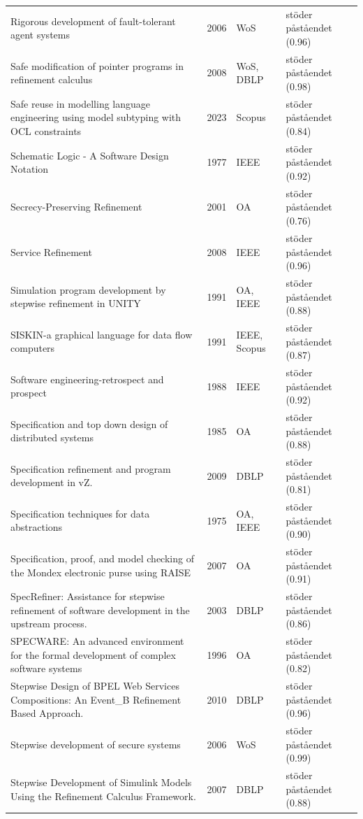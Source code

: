 \begin{longtable}{@{}%
  >{\raggedright\arraybackslash}p{}c%
  >{\raggedright\arraybackslash}p{}%
  >{\raggedright\arraybackslash}p{}@{}}
Rigorous development of fault-tolerant agent systems & 2006 & WoS & stöder påståendet (0.96) \\
Safe modification of pointer programs in refinement calculus & 2008 & WoS, DBLP & stöder påståendet (0.98) \\
Safe reuse in modelling language engineering using model subtyping with OCL constraints & 2023 & Scopus & stöder påståendet (0.84) \\
Schematic Logic - A Software Design Notation & 1977 & IEEE & stöder påståendet (0.92) \\
Secrecy-Preserving Refinement & 2001 & OA & stöder påståendet (0.76) \\
Service Refinement & 2008 & IEEE & stöder påståendet (0.96) \\
Simulation program development by stepwise refinement in UNITY & 1991 & OA, IEEE & stöder påståendet (0.88) \\
SISKIN-a graphical language for data flow computers & 1991 & IEEE, Scopus & stöder påståendet (0.87) \\
Software engineering-retrospect and prospect & 1988 & IEEE & stöder påståendet (0.92) \\
Specification and top down design of distributed systems & 1985 & OA & stöder påståendet (0.88) \\
Specification refinement and program development in vZ. & 2009 & DBLP & stöder påståendet (0.81) \\
Specification techniques for data abstractions & 1975 & OA, IEEE & stöder påståendet (0.90) \\
Specification, proof, and model checking of the Mondex electronic purse using RAISE & 2007 & OA & stöder påståendet (0.91) \\
SpecRefiner: Assistance for stepwise refinement of software development in the upstream process. & 2003 & DBLP & stöder påståendet (0.86) \\
SPECWARE: An advanced environment for the formal development of complex software systems & 1996 & OA & stöder påståendet (0.82) \\
Stepwise Design of BPEL Web Services Compositions: An Event\_B Refinement Based Approach. & 2010 & DBLP & stöder påståendet (0.96) \\
Stepwise development of secure systems & 2006 & WoS & stöder påståendet (0.99) \\
Stepwise Development of Simulink Models Using the Refinement Calculus Framework. & 2007 & DBLP & stöder påståendet (0.88) \\

\end{longtable}
